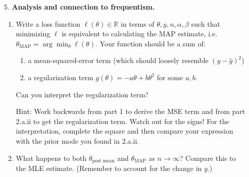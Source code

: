 \documentclass[submit]{harvardml}
\begin{document}
\begin{framed}
\begin{enumerate}
  \item[5.]
    \textbf{Analysis and connection to frequentism.}
  
    \begin{enumerate}
    \item
      Write a loss function \(\ell(\theta) \in \mathbb{R}\) in terms of
      \(\theta, y, n, \alpha, \beta\) such that minimizing \(\ell\) is
      equivalent to calculating the MAP estimate,
      i.e.~\(\theta_{\text{MAP}} = \arg \min_{\theta} \ell(\theta)\). Your
      function should be a sum of:
      \begin{enumerate}
        \item a mean-squared-error term (which should loosely resemble $(y - \hat y)^2$)
        \item a
        regularization term \(g(\theta) = - a \theta + b \theta^{2}\) for some $a, b$.
      \end{enumerate}
      
      Can you interpret the regularization term? 
      
      Hint: Work backwards from part 1 to derive the MSE term and from part 2.a.ii to get the regularization term. Watch out for the signs! For the interpretation, complete the square and then compare your expression with the prior mode you found in 2.a.ii.
    \item
      What happens to both $\theta_{\text{post mean}}$ and $\theta_{\text{MAP}}$ as \(n \to \infty\)? Compare this to the MLE estimate.
      (Remember to account for the change in \(y\).)
    \end{enumerate}
  
\end{enumerate}

\end{framed}
\end{document}

